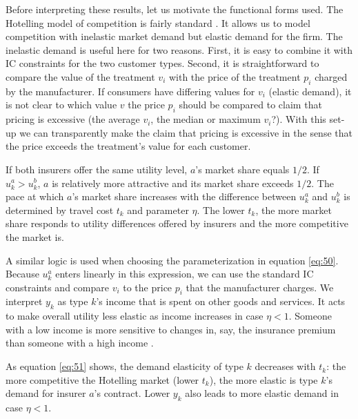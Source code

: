 \documentclass[12pt,english,a4paper]{article}
\begin{document}
Before interpreting these results, let us motivate the functional forms used. The Hotelling model of competition is fairly standard \citep{Tirole}. It allows us to model competition with inelastic market demand but elastic demand for the firm. The inelastic demand is useful here for two reasons. First, it is easy to combine it with IC constraints for the two customer types. Second, it is straightforward to compare the value of the treatment \(v_i\) with the price of the treatment \(p_i\) charged by the manufacturer. If consumers have differing values for \(v_i\) (elastic demand), it is not clear to which value \(v\) the price \(p_i\) should be compared to claim that pricing is excessive (the average \(v_{i}\), the median or maximum \(v_i\)?). With this set-up we can transparently make the claim that pricing is excessive in the sense that the price exceeds the treatment's value for each customer.

If both insurers offer the same utility level, \(a\)'s market share equals \(1/2\). If \(u^a_k > u^b_k\), \(a\) is relatively more attractive and its market share exceeds \(1/2\). The pace at which \(a\)'s market share increases with the difference between \(u_k^a\) and \(u_k^b\) is determined by travel cost \(t_k\) and parameter \(\eta\). The lower \(t_k\), the more market share responds to utility differences offered by insurers and the more competitive the market is.

A similar logic is used when choosing the parameterization in equation \eqref{eq:50}. Because \(u_k^a\) enters linearly in this expression, we can use the standard IC constraints and compare \(v_i\) to the price \(p_i\) that the manufacturer charges. We interpret \(y_k\) as type \(k\)'s income that is spent on other goods and services. It acts to make overall utility less elastic as income increases in case \(\eta<1\). Someone with a low income is more sensitive to changes in, say, the insurance premium than someone with a high income \citep{hogan2017}.

As equation \eqref{eq:51} shows, the demand elasticity of type \(k\) decreases with \(t_k\): the more competitive the Hotelling market (lower \(t_k\)), the more elastic is type \(k\)'s demand for insurer \(a\)'s contract. Lower \(y_k\) also leads to more elastic demand in case \(\eta<1\).
\end{document}
